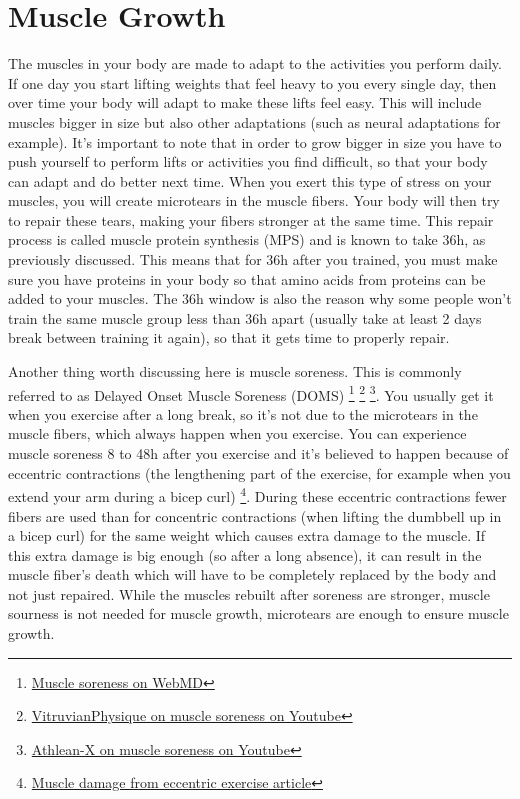 \documentclass[openany, 12pt]{book}
\begin{document}
        \section{Muscle Growth}

        The muscles in your body are made to adapt to the activities you perform daily. If one day you start lifting weights that feel heavy to you every single day, then over time your body will
        adapt to make these lifts feel easy. This will include muscles bigger in size but also other adaptations (such as neural adaptations for example). It's important to note that in order to
        grow bigger in size you have to push yourself to perform lifts or activities you find difficult, so that your body can adapt and do better next time. When you exert this type of stress on
        your muscles, you will create microtears in the muscle fibers. Your body will then try to repair these tears, making your fibers stronger at the same time. This repair process is called
        muscle protein synthesis (MPS) and is known to take 36h, as previously discussed. This means that for 36h after you trained, you must make sure you have proteins in your body so that
        amino acids from proteins can be added to your muscles. The 36h window is also the reason why some people won't train the same muscle group less than 36h apart (usually take at least
        2 days break between training it again), so that it gets time to properly repair.

        Another thing worth discussing here is muscle soreness. This is commonly referred to as Delayed Onset Muscle Soreness (DOMS)
        \footnote{\href{https://www.webmd.com/fitness-exercise/features/sore-muscles-dont-stop-exercising}{Muscle soreness on WebMD}}
        \footnote{\href{https://www.youtube.com/watch?v=S8PycfGxIxY}{VitruvianPhysique on muscle soreness on Youtube}}
        \footnote{\href{https://www.youtube.com/watch?v=vlGZfIgc6Vk}{Athlean-X on muscle soreness on Youtube}}. You usually get it when you exercise after a long break,
        so it's not due to the microtears in the muscle fibers, which always happen when you exercise. You can experience muscle soreness 8 to 48h after you exercise and it's believed to
        happen because of eccentric contractions (the lengthening part of the exercise, for example when you extend your arm during a bicep curl)
        \footnote{\href{https://www.ncbi.nlm.nih.gov/pmc/articles/PMC2278966/}{Muscle damage from eccentric exercise article}}. During these eccentric contractions fewer
        fibers are used than for concentric contractions (when lifting the dumbbell up in a bicep curl) for the same weight which causes extra damage to the muscle. If this extra damage is
        big enough (so after a long absence), it can result in the muscle fiber's death which will have to be completely replaced by the body and not just repaired. While the muscles rebuilt
        after soreness are stronger, muscle sourness is not needed for muscle growth, microtears are enough to ensure muscle growth.
\end{document}
